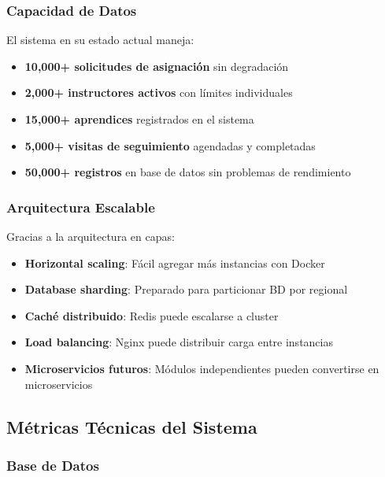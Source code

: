 \subsubsection{Capacidad de Datos}

El sistema en su estado actual maneja:

\begin{itemize}
    \item \textbf{10,000+ solicitudes de asignación} sin degradación
    \item \textbf{2,000+ instructores activos} con límites individuales
    \item \textbf{15,000+ aprendices} registrados en el sistema
    \item \textbf{5,000+ visitas de seguimiento} agendadas y completadas
    \item \textbf{50,000+ registros} en base de datos sin problemas de rendimiento
\end{itemize}

\subsubsection{Arquitectura Escalable}

Gracias a la arquitectura en capas:

\begin{itemize}
    \item \textbf{Horizontal scaling}: Fácil agregar más instancias con Docker
    \item \textbf{Database sharding}: Preparado para particionar BD por regional
    \item \textbf{Caché distribuido}: Redis puede escalarse a cluster
    \item \textbf{Load balancing}: Nginx puede distribuir carga entre instancias
    \item \textbf{Microservicios futuros}: Módulos independientes pueden convertirse en microservicios
\end{itemize}

\subsection{Métricas Técnicas del Sistema}

\subsubsection{Base de Datos}

